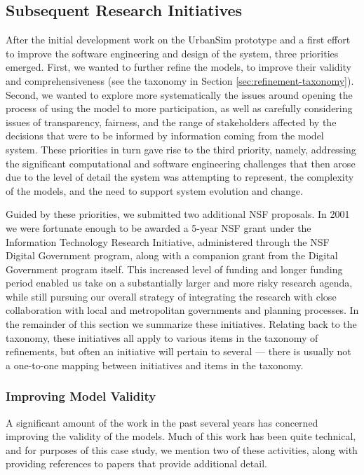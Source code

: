 
\subsection{Subsequent Research Initiatives}

After the initial development work on the UrbanSim prototype and a first
effort to improve the software engineering and design of the system, three
priorities emerged.  First, we wanted to further refine the models, to
improve their validity and comprehensiveness (see the taxonomy in Section
\ref{sec:refinement-taxonomy}).  Second, we wanted to explore more
systematically the issues around opening the process of using the model to
more participation, as well as carefully considering issues of
transparency, fairness, and the range of stakeholders affected by the
decisions that were to be informed by information coming from the model
system.  These priorities in turn gave rise to the third priority, namely,
addressing the significant computational and software engineering
challenges that then arose due to the level of detail the system was
attempting to represent, the complexity of the models, and the need to
support system evolution and change.

Guided by these priorities, we submitted two additional NSF proposals.  In
2001 we were fortunate enough to be awarded a 5-year NSF grant under the
Information Technology Research Initiative, administered through the NSF
Digital Government program, along with a companion grant from the Digital
Government program itself.  This increased level of funding and longer
funding period enabled us take on a substantially larger and more risky
research agenda, while still pursuing our overall strategy of integrating
the research with close collaboration with local and metropolitan
governments and planning processes.  In the remainder of this section we
summarize these initiatives.  Relating back to the taxonomy, these
initiatives all apply to various items in the taxonomy of refinements, but
often an initiative will pertain to several --- there is usually not a
one-to-one mapping between initiatives and items in the taxonomy.

\subsubsection{Improving Model Validity}

A significant amount of the work in the past several years has concerned
improving the validity of the models.  Much of this work has been quite
technical, and for purposes of this case study, we mention two of these
activities, along with providing references to papers that provide
additional detail.

